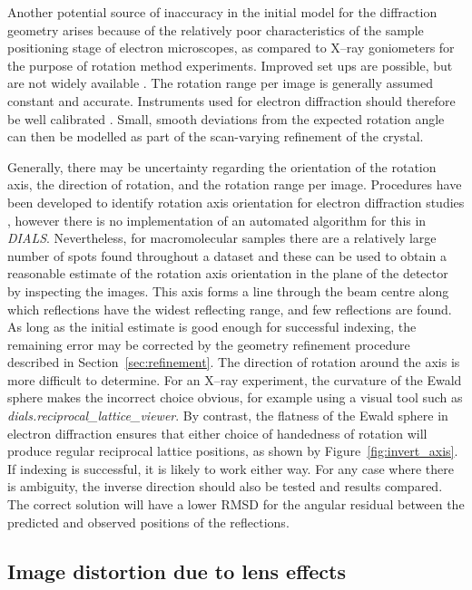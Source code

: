 \documentclass[preprint]{iucr}
\newcommand{\dials}{\emph{DIALS}\xspace}
\newcommand{\dialsreciprocallatticeviewer}{\emph{dials.reciprocal\_lattice\_viewer}\xspace}
\begin{document}
Another potential source of inaccuracy in the initial model for the diffraction
geometry arises because of the relatively poor characteristics of the sample
positioning stage of electron microscopes, as compared to X--ray goniometers for the
purpose of rotation method experiments. Improved set ups are possible,
but are not widely available \cite{Yonekura2015,Shi2016}.
The rotation range per image is generally assumed constant and accurate.
Instruments used
for electron diffraction should therefore be well calibrated
\cite{gemmi_adt:2015}. Small, smooth deviations from the expected rotation angle
can then be modelled as part of the scan-varying refinement of the crystal.

Generally, there may be
uncertainty regarding the orientation of the rotation axis, the direction of
rotation, and the rotation range per image. Procedures have been developed to
identify rotation axis orientation for electron diffraction studies
\cite{Dorset1976,Kolb2009}, however there is no implementation of an
automated algorithm for this in \dials. Nevertheless, for macromolecular
samples there are a relatively large number of spots found throughout a dataset
and these can be used to obtain a reasonable estimate of the
rotation axis orientation in the plane of the detector by inspecting the images.
This axis forms a
line through the beam centre along which reflections have the widest reflecting
range, and few reflections are found. As long as the initial estimate is good
enough for successful indexing, the remaining error may be corrected by
the geometry refinement procedure described in Section~\ref{sec:refinement}.
The direction of rotation around the axis
is more difficult to determine. For an X--ray experiment, the curvature of the
Ewald sphere makes the incorrect choice obvious, for example using a visual
tool such as \dialsreciprocallatticeviewer \cite{Winter2018}. By contrast, the
flatness of the Ewald sphere in electron diffraction ensures that either choice
of handedness of rotation will produce regular reciprocal lattice positions,
as shown by Figure~\ref{fig:invert_axis}. If indexing is successful, it is
likely to work either way. For any case where there is ambiguity, the inverse
direction should also be tested and results compared. The correct solution will
have a lower RMSD for the angular residual between the predicted and observed
positions of the reflections.

\subsection{Image distortion due to lens effects \label{sec:distortion}}
\end{document}
